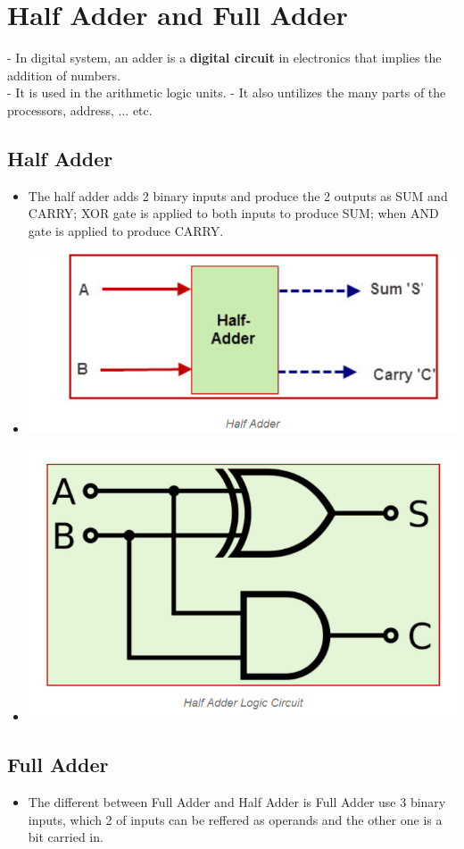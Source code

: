 \documentclass[12pt]{article}
\begin{document}
\section{Half Adder and Full Adder}
- In digital system, an adder is a \textbf{digital circuit} in electronics that implies the addition of numbers. \\
- It is used in the arithmetic logic units.
- It also untilizes the many parts of the processors, address, ... etc. \\
\subsection{Half Adder}
\begin{itemize}
	\item The half adder adds 2 binary inputs and produce the 2 outputs as SUM and CARRY; XOR gate is applied to both inputs to produce SUM; when AND gate is applied to produce CARRY.
	\item \includegraphics[scale = 0.6]{hinh17}
	\item \includegraphics[scale = 0.6]{hinh18}
\end{itemize}
\subsection{Full Adder}
\begin{itemize}
	\item The different between Full Adder and Half Adder is Full Adder use 3 binary inputs, which 2 of inputs can be reffered as operands and the other one is a bit carried in.
\end{itemize}
\end{document}
